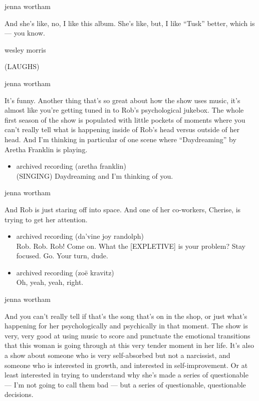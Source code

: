 jenna wortham

And she's like, no, I like this album. She's like, but, I like ``Tusk''
better, which is --- you know.

wesley morris

(LAUGHS)

jenna wortham

It's funny. Another thing that's so great about how the show uses music,
it's almost like you're getting tuned in to Rob's psychological jukebox.
The whole first season of the show is populated with little pockets of
moments where you can't really tell what is happening inside of Rob's
head versus outside of her head. And I'm thinking in particular of one
scene where ``Daydreaming'' by Aretha Franklin is playing.

\begin{itemize}
\tightlist
\item
  archived recording (aretha franklin)\\
  (SINGING) Daydreaming and I'm thinking of you.
\end{itemize}

jenna wortham

And Rob is just staring off into space. And one of her co-workers,
Cherise, is trying to get her attention.

\begin{itemize}
\item
  archived recording (da'vine joy randolph)\\
  Rob. Rob. Rob! Come on. What the {[}EXPLETIVE{]} is your problem? Stay
  focused. Go. Your turn, dude.
\item
  archived recording (zoë kravitz)\\
  Oh, yeah, yeah, right.
\end{itemize}

jenna wortham

And you can't really tell if that's the song that's on in the shop, or
just what's happening for her psychologically and psychically in that
moment. The show is very, very good at using music to score and
punctuate the emotional transitions that this woman is going through at
this very tender moment in her life. It's also a show about someone who
is very self-absorbed but not a narcissist, and someone who is
interested in growth, and interested in self-improvement. Or at least
interested in trying to understand why she's made a series of
questionable --- I'm not going to call them bad --- but a series of
questionable, questionable decisions.

